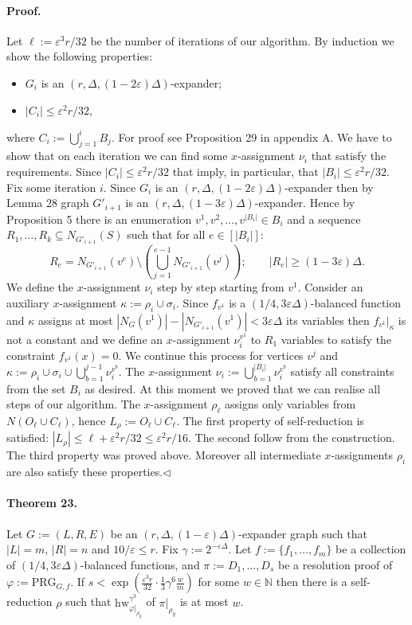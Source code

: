 \documentclass[10pt,a4paper]{article}
\begin{document}
\paragraph{Proof.} Let $\ell:=\varepsilon^3r/32$ be the number of iterations of our algorithm.
By induction we show the following properties:
\begin{itemize}
\item $G_i$ is an $(r,\Delta,(1-2\varepsilon)\Delta)$-expander;
\item $|C_i|\leq\varepsilon^2r/32$,
\end{itemize}
where $C_i:=\bigcup_{j=1}^iB_j$. For proof see Proposition 29 in appendix A.
We have to show that on each iteration we can find some $x$-assignment $\nu_i$ that satisfy the requirements. Since $|C_i|\leq\varepsilon^2r/32$ that imply, in particular, that $|B_i|\leq\varepsilon^2r/32$.
Fix some iteration $i$. Since $G_i$ is an $(r,\Delta,(1-2\varepsilon)\Delta)$-expander then by Lemma 28 graph $G'_{i+1}$ is an $(r,\Delta,(1-3\varepsilon)\Delta)$-expander. Hence by Proposition 5 there is an enumeration $v^1,v^2,\ldots,v^{|B_i|}\in B_i$ and a sequence $R_1,\ldots,R_k\subseteq N_{G'_{i+1}}(S)$ such that for all $e\in[|B_i|]$:
\[R_e=N_{G'_{i+1}}(v^e)\setminus\left(\bigcup_{j=1}^{e-1}N_{G'_{i+1}}(v^j)\right);\qquad|R_e|\geq(1-3\varepsilon)\Delta.\]
We define the $x$-assignment $\nu_i$ step by step starting from $v^1$. Consider an auxiliary $x$-assignment $\kappa:=\rho_i\cup\sigma_i$. Since $f_{v^1}$ is a $(1/4,3\varepsilon\Delta)$-balanced function and $\kappa$ assigns at most $|N_G(v^1)|-|N_{G'_{i+1}}(v^1)|<3\varepsilon\Delta$ its variables then $f_{v^1}|_\kappa$ is not a constant and we define an $x$-assignment $\nu_i^{v^1}$ to $R_1$ variables to satisfy the constraint $f_{v^1}(x)=0$. We continue this process for vertices $v^j$ and $\kappa:=\rho_i\cup\sigma_i\cup\bigcup_{b=1}^{j-1}\nu_i^{v^b}$. The $x$-assignment $\nu_i:=\bigcup_{b=1}^{|B_i|}\nu_i^{v^b}$ satisfy all constraints from the set $B_i$ as desired.
At this moment we proved that we can realise all steps of our algorithm. The $x$-assignment $\rho_\ell$ assigns only variables from $N(O_\ell\cup C_\ell)$, hence $L_\rho:=O_\ell\cup C_\ell$. The first property of self-reduction is satisfied: $|L_\rho|\leq\ell+\varepsilon^2r/32\leq\varepsilon^2r/16$. The second follow from the construction. The third property was proved above. Moreover all intermediate $x$-assignments $\rho_i$ are also satisfy these properties.\hfill$\triangleleft$
\paragraph{Theorem 23.} Let $G:=(L,R,E)$ be an $(r,\Delta,(1-\varepsilon)\Delta)$-expander graph such that $|L|=m$, $|R|=n$ and $10/\varepsilon\leq r$. Fix $\gamma:=2^{-\varepsilon\Delta}$. Let $f:=\{f_1,\ldots,f_m\}$ be a collection of $(1/4,3\varepsilon\Delta)$-balanced functions, and $\pi:=D_1,\ldots,D_s$ be a resolution proof of $\varphi:=\mathrm{PRG}_{G,f}$.
If $s<\exp(\frac{\varepsilon^3r}{32}\cdot\frac13\gamma^6\frac wm)$ for some $w\in\mathbb N$ then there is a self-reduction $\rho$ such that $\mathrm{hw}_{\varphi|_{\rho_y}}^{\gamma^3}$ of $\pi|_{\rho_y}$ is at most $w$.
\end{document}
